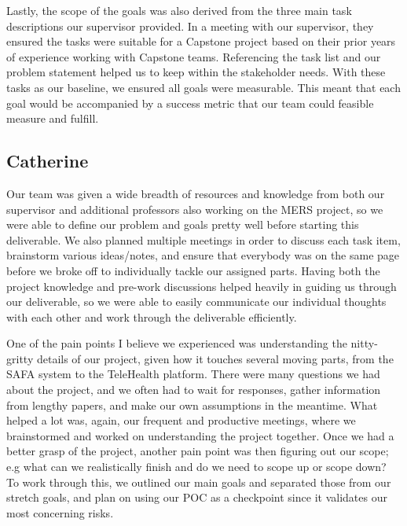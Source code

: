 \documentclass{article}
\begin{document}
Lastly, the scope of the goals was also derived from the three main task descriptions our supervisor provided. 
In a meeting with our supervisor, they ensured the tasks were suitable for a Capstone project based on their prior 
years of experience working with Capstone teams. Referencing the task list and our problem statement helped us to keep 
within the stakeholder needs. With these tasks as our baseline, we ensured all goals were measurable. This meant that each 
goal would be accompanied by a success metric that our team could feasible measure and fulfill. 

\subsection*{Catherine}
Our team was given a wide breadth of resources and knowledge from both our supervisor
and additional professors also working on the MERS project, so we were able to define
our problem and goals pretty well before starting this deliverable. We also
planned multiple meetings in order to discuss each task item, brainstorm various ideas/notes, 
and ensure that everybody was on the same page before we broke off to
individually tackle our assigned parts. Having both the project knowledge and pre-work
discussions helped heavily in guiding us through our deliverable, so we were able
to easily communicate our individual thoughts with each other and work through the
deliverable efficiently.

One of the pain points I believe we experienced was understanding the nitty-gritty
details of our project, given how it touches several moving parts, from the SAFA
system to the TeleHealth platform. There were many questions we had about the project,
and we often had to wait for responses, gather information from lengthy papers, and
make our own assumptions in the meantime. What helped a lot was, again, our frequent
and productive meetings, where we brainstormed and worked on understanding the project
together. Once we had a better grasp of the project, another pain point was then figuring 
out our scope; e.g what can we realistically finish and do we need to scope up or 
scope down? To work through this, we outlined our main goals and separated those from our
stretch goals, and plan on using our POC as a checkpoint since it validates
our most concerning risks. 
\end{document}
